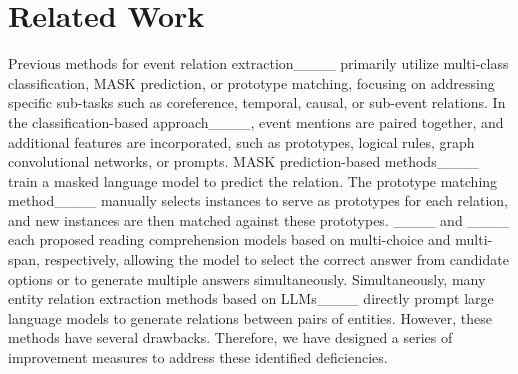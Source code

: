 \section{Related Work}
Previous methods for event relation extraction____ primarily utilize multi-class classification, MASK prediction, or prototype matching, focusing on addressing specific sub-tasks such as coreference, temporal, causal, or sub-event relations. In the classification-based approach____, event mentions are paired together, and additional features are incorporated, such as prototypes, logical rules, graph convolutional networks, or prompts. MASK prediction-based methods____ train a masked language model to predict the relation. The prototype matching method____ manually selects instances to serve as prototypes for each relation, and new instances are then matched against these prototypes. ____ and ____ each proposed reading comprehension models based on multi-choice and multi-span, respectively, allowing the model to select the correct answer from candidate options or to generate multiple answers simultaneously. Simultaneously, many entity relation extraction methods based on LLMs____ directly prompt large language models to generate relations between pairs of entities. However, these methods have several drawbacks. Therefore, we have designed a series of improvement measures to address these identified deficiencies.